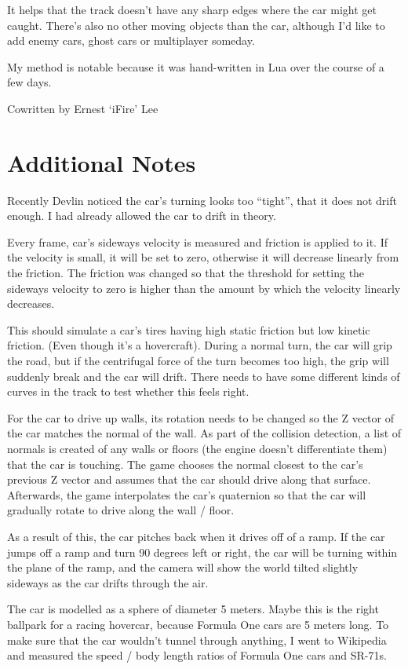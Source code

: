 \documentclass[]{book}
\begin{document}
It helps that the track doesn't have any sharp edges where the car might
get caught. There's also no other moving objects than the car, although
I'd like to add enemy cars, ghost cars or multiplayer someday.

My method is notable because it was hand-written in Lua over the course
of a few days.

Cowritten by Ernest `iFire' Lee

\section{Additional Notes}\label{additional-notes}

Recently Devlin noticed the car's turning looks too ``tight'', that it
does not drift enough. I had already allowed the car to drift in theory.

Every frame, car's sideways velocity is measured and friction is applied
to it. If the velocity is small, it will be set to zero, otherwise it
will decrease linearly from the friction. The friction was changed so
that the threshold for setting the sideways velocity to zero is higher
than the amount by which the velocity linearly decreases.

This should simulate a car's tires having high static friction but low
kinetic friction. (Even though it's a hovercraft). During a normal turn,
the car will grip the road, but if the centrifugal force of the turn
becomes too high, the grip will suddenly break and the car will drift.
There needs to have some different kinds of curves in the track to test
whether this feels right.

For the car to drive up walls, its rotation needs to be changed so the Z
vector of the car matches the normal of the wall. As part of the
collision detection, a list of normals is created of any walls or floors
(the engine doesn't differentiate them) that the car is touching. The
game chooses the normal closest to the car's previous Z vector and
assumes that the car should drive along that surface. Afterwards, the
game interpolates the car's quaternion so that the car will gradually
rotate to drive along the wall / floor.

As a result of this, the car pitches back when it drives off of a ramp.
If the car jumps off a ramp and turn 90 degrees left or right, the car
will be turning within the plane of the ramp, and the camera will show
the world tilted slightly sideways as the car drifts through the air.

The car is modelled as a sphere of diameter 5 meters. Maybe this is the
right ballpark for a racing hovercar, because Formula One cars are 5
meters long. To make sure that the car wouldn't tunnel through anything,
I went to Wikipedia and measured the speed / body length ratios of
Formula One cars and SR-71s.
\end{document}
